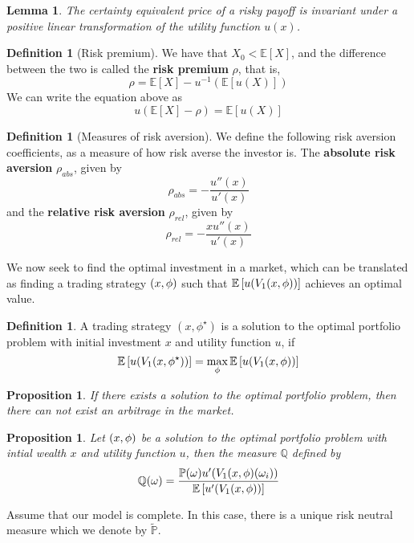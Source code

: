 \documentclass[10pt, oneside, reqno]{amsart}
\theoremstyle{plain}%
\newtheorem{lem}[thm]{Lemma}
\newtheorem{prop}[thm]{Proposition}
\theoremstyle{definition}
\newtheorem{defn}[thm]{Definition}
\theoremstyle{remark}
\newcommand{\expc}[1]{\mathbb{E}\left[#1\right]}
\newcommand{\prob}[1]{\mathbb{P}(#1)}
\newcommand{\Q}{\mathbb{Q}}
\newcommand{\rnm}{\tilde{\mathbb{P}}}
\begin{document}
\begin{lem}
    The certainty equivalent price of a risky payoff is invariant under a positive linear transformation of the utility function $u(x)$. 
\end{lem}




\begin{defn}[Risk premium]
    We have that $X_0 < \expc{X}$, and the difference between the two is called the \textbf{risk premium} $\rho$, that is, \[
        \rho = \expc{X} - u^{-1} \left( \expc{u(X)} \right) 
    \]
We can write the equation above as \[
    u(\expc{X} - \rho) = \expc{u(X)}
\]
\end{defn}

\begin{defn}[Measures of risk aversion]
    We define the following risk aversion coefficients, as a measure of how risk averse the investor is.
    The \textbf{absolute risk aversion} $\rho_{abs}$, given by \[
        \rho_{abs} = - \frac{u''(x)}{u'(x)}
    \]   and the \textbf{relative risk aversion} $\rho_{rel}$, given by \[
        \rho_{rel} = - \frac{ x u''(x)}{u'(x)}
    \]  
\end{defn}

We now seek to find the optimal investment in a market, which can be translated as finding a trading strategy $(x,\phi)$ such that $\expc{u(V_1 \tst)}$ achieves an optimal value.

\begin{defn}
    A trading strategy $(x,\phi^\star)$ is a solution to the optimal portfolio problem with initial investment $x$ and utility function $u$, if \[
        \expc{u(V_1(x,\phi^\star))} = \max_{\phi} \expc{u(V_1 \tst)}
    \]
\end{defn}

\begin{prop}
    If there exists a solution to the optimal portfolio problem, then there can not exist an arbitrage in the market.
\end{prop}

\begin{prop}
    Let $(x,\phi)$ be a solution to the optimal portfolio problem with intial wealth $x$ and utility function $u$, then the measure $\Q$ defined by \[
        \Q(\omega) = \frac{\prob{\omega} u'(V_1 \tst(\omega_i))}{\expc{u'(V_1 \tst)}}
    \]
\end{prop}

Assume that our model is complete.  In this case, there is a unique risk neutral measure which we denote by $\rnm$.
\end{document}
